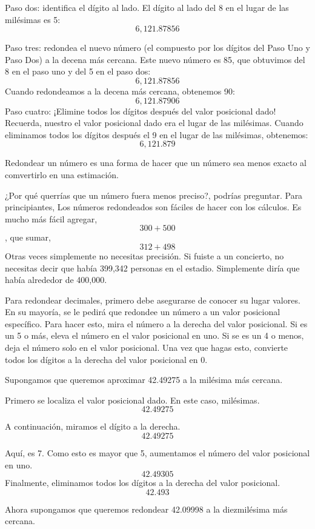 Paso dos: identifica el dígito al lado. El dígito al lado del 8 en el
lugar de las milésimas es 5:
\[6,121.87 \boxed{8} \boxed{5} 6\]

Paso tres: redondea el nuevo número (el compuesto por los dígitos del Paso
Uno y Paso Dos) a la decena más cercana. Este nuevo número es 85, que obtuvimos
del 8 en el paso uno y del 5 en el paso dos:
\[6,121.87 \boxed{85} 6\]
Cuando redondeamos a la decena más cercana, obtenemos 90:
\[6,121.87 \boxed{90} 6\]
Paso cuatro: ¡Elimine todos los dígitos después del valor posicional dado! Recuerda, nuestro
el valor posicional dado era el lugar de las milésimas. Cuando eliminamos todos los dígitos después
el 9 en el lugar de las milésimas, obtenemos:
\[6,121.879\]

Redondear un número es una forma de hacer que un número sea menos exacto al comvertirlo
en una estimación.

¿Por qué querrías que un número fuera menos preciso?, podrías preguntar. Para principiantes,
Los números redondeados son fáciles de hacer con los cálculos. Es mucho más fácil agregar,
\[300 + 500\],
que sumar,
\[312 + 498\]
Otras veces simplemente no necesitas precisión. Si fuiste a un concierto, no necesitas decir que había 399,342 personas
en el estadio. Simplemente diría que había alrededor de 400,000.

Para redondear decimales, primero debe asegurarse de conocer su lugar valores. En su mayoría, se le pedirá que redondee un número a un valor posicional específico. Para hacer esto, mira el número a la derecha del valor posicional. Si es un 5 o más, eleva el número en el valor posicional en uno. Si se
es un 4 o menos, deja el número solo en el valor posicional. Una vez que hagas esto,
convierte todos los dígitos a la derecha del valor posicional en 0.

Supongamos que queremos aproximar 42.49275 a la milésima más cercana.

Primero se localiza el valor posicional dado. En este caso, milésimas.
\[42.49\boxed{2} 75\]

A continuación, miramos el dígito a la derecha.
\[42.49\boxed{2} \boxed{7}5\]

Aquí, es 7. Como esto es mayor que 5, aumentamos el número del valor posicional en uno.
\[42.49\boxed{3} \boxed{0}5\]
Finalmente, eliminamos todos los dígitos a la derecha del valor posicional.
\[42.49\boxed{3} \]


Ahora supongamos que queremos redondear 42.09998 a la diezmilésima más cercana.

